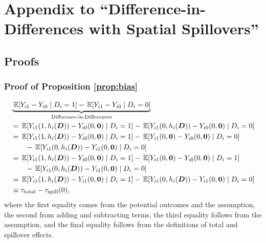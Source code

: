 \chapter{Appendix to ``Difference-in-Differences with Spatial Spillovers''}

\section{Proofs}
\label{sec:spillover-proofs}

\subsection{Proof of Proposition \ref{prop:bias}}

\begin{align*}
    &\underbrace{\expec{Y_{i1} - Y_{i0} \mid D_i = 1 } - \expec{Y_{i1} - Y_{i0} \mid D_i = 0 }}_{\text{Difference-in-Differences}} \\
    &= \expec{Y_{i1}(1, h_i(\bm{D})) - Y_{i0}(0, \bm{0})  \mid D_i = 1 } - \expec{Y_{i1}(0, h_i(\bm{D})) - Y_{i0}(0, \bm{0}) \mid D_i = 0 } \\
    &= \expec{Y_{i1}(1, h_i(\bm{D})) - Y_{i0}(0, \bm{0})  \mid D_i = 1 } - \expec{Y_{i1}(0, \bm{0}) - Y_{i0}(0, \bm{0}) \mid D_i = 0} \\ 
    &\quad\quad - \expec{Y_{i1}(0, h_i(\bm{D})) - Y_{i1}(0, \bm{0})\mid D_i = 0} \\ 
    &= \expec{Y_{i1}(1, h_i(\bm{D})) - Y_{i0}(0, \bm{0})  \mid D_i = 1 } - \expec{Y_{i1}(0, \bm{0}) - Y_{i0}(0, \bm{0}) \mid D_i = 1} \\
    &\quad\quad - \expec{Y_{i1}(0, h_i(\bm{D})) - Y_{i1}(0, \bm{0})\mid D_i = 0} \\  
    &= \expec{Y_{i1}(1, h_i(\bm{D})) - Y_{i1}(0, \bm{0}) \mid D_i = 1 } - \expec{Y_{i1}(0, h_i(\bm{D})) - Y_{i1}(0, \bm{0})\mid D_i = 0} \\
    &\equiv \tau_{\text{total}} - \tau_{\text{spill}}(0), 
\end{align*}
where the first equality comes from the potential outcomes and the  assumption, the second from adding and subtracting terms, the third equality follows from the  assumption, and the final equality follows from the definitions of total and spillover effects.

